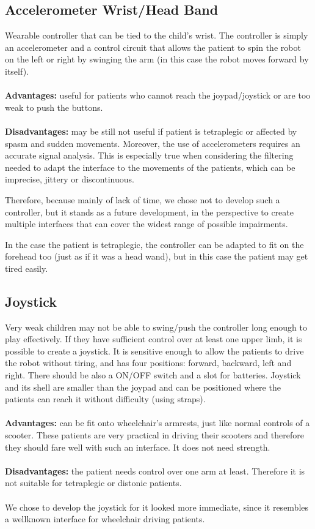 \documentclass[a4paper,twoside]{book}
\begin{document}
\subsection{Accelerometer Wrist/Head Band}
\label{ssec:accel}
Wearable controller that can be tied to the child's wrist. The controller is simply an accelerometer and a control circuit that allows the patient to spin the robot on the left or right by swinging the arm (in this case the robot moves forward by itself).
\\
\\
\textbf{Advantages:} useful for patients who cannot reach the joypad/joystick or are too weak to push the buttons.
\\
\\
\textbf{Disadvantages:} may be still not useful if patient is tetraplegic or affected by spasm and sudden movements. Moreover, the use of accelerometers requires an accurate signal analysis. This is especially true when considering the filtering needed to adapt the interface to the movements of the patients, which can be imprecise, jittery or discontinuous. 

Therefore, because mainly of lack of time, we chose not to develop such a controller, but it stands as a future development, in the perspective to create multiple interfaces that can cover the widest range of possible impairments.

In the case the patient is tetraplegic, the controller can be adapted to fit on the forehead too (just as if it was a head wand), but in this case the patient may get tired easily.

\subsection{Joystick}

Very weak children may not be able to swing/push the controller long enough to play effectively. If they have sufficient control over at least one upper limb, it is possible to create a joystick. It is sensitive enough to allow the patients to drive the robot without tiring, and has four positions: forward, backward, left and right. There should be also a ON/OFF switch and a slot for batteries. Joystick and its shell are smaller than the joypad and can be positioned where the patients can reach it without difficulty (using straps).
\\
\\
\textbf{Advantages:} can be fit onto wheelchair's armrests, just like normal controls of a scooter. These patients are very practical in driving their scooters and therefore they should fare well with such an interface. It does not need strength.
\\
\\
\textbf{Disadvantages:} the patient needs control over one arm at least. Therefore it is not suitable for tetraplegic or distonic patients.
\\
\\
We chose to develop the joystick for it looked more immediate, since it resembles a well\textendash known interface for wheelchair driving patients.
\\
\end{document}
